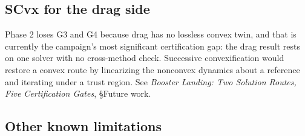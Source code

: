 \documentclass[11pt]{article}
\newcommand{\thenote}{\emph{Booster Landing: Two Solution Routes, Five
Certification Gates}}
\newcommand{\noteS}[1]{\thenote, \S#1}
\begin{document}
\subsection{SCvx for the drag side}

Phase 2 loses G3 and G4 because drag has no lossless convex twin, and that
is currently the campaign's most significant certification gap: the drag
result rests on one solver with no cross-method check. Successive
convexification would restore a convex route by linearizing the nonconvex
dynamics about a reference and iterating under a trust region. See
\noteS{Future work}.

\subsection{Other known limitations}
\end{document}
